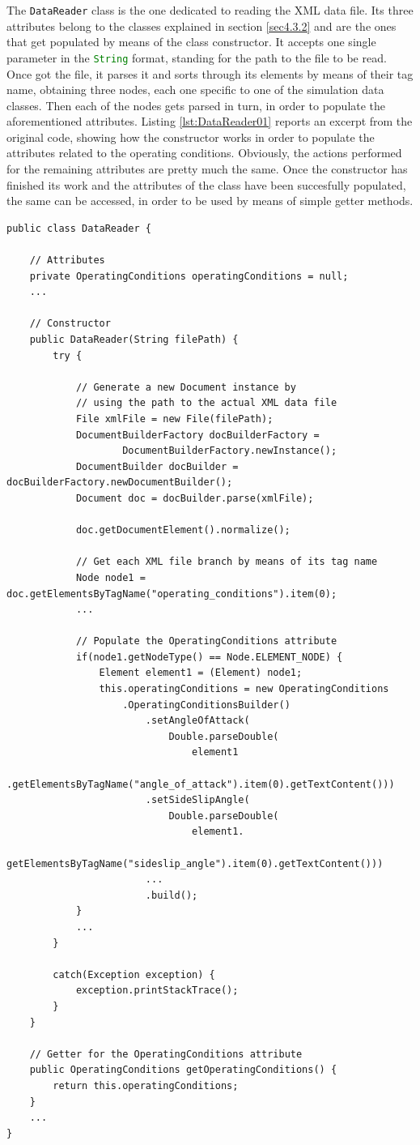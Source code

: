 The \lstinline[language=Java]!DataReader! class is the one dedicated to reading the XML data file. Its three attributes belong to the classes explained in section \ref{sec4.3.2} and are the ones that get populated by means of the class constructor. It accepts one single parameter in the \lstinline[language=Java]!String! format, standing for the path to the file to be read. Once got the file, it parses it and sorts through its elements by means of their tag name, obtaining three nodes, each one specific to one of the simulation data classes. Then each of the nodes gets parsed in turn, in order to populate the aforementioned attributes. Listing \ref{lst:DataReader01} reports an excerpt from the original code, showing how the constructor works in order to populate the attributes related to the operating conditions. Obviously, the actions performed for the remaining attributes are pretty much the same. Once the constructor has finished its work and the attributes of the class have been succesfully populated, the same can be accessed, in order to be used by means of simple getter methods. 
\bigskip
\begin{lstlisting}[caption={\lstinline!DataReader! class overview}, captionpos=b, tabsize=2, label={lst:DataReader01}]
public class DataReader {
	
	// Attributes
	private OperatingConditions operatingConditions = null;
	...
	
	// Constructor
	public DataReader(String filePath) {
		try {
			
			// Generate a new Document instance by  
			// using the path to the actual XML data file
			File xmlFile = new File(filePath);
			DocumentBuilderFactory docBuilderFactory = 
					DocumentBuilderFactory.newInstance();
			DocumentBuilder docBuilder = docBuilderFactory.newDocumentBuilder();
			Document doc = docBuilder.parse(xmlFile);
			
			doc.getDocumentElement().normalize();
			
			// Get each XML file branch by means of its tag name
			Node node1 = doc.getElementsByTagName("operating_conditions").item(0);
			...
			
			// Populate the OperatingConditions attribute
			if(node1.getNodeType() == Node.ELEMENT_NODE) {
				Element element1 = (Element) node1;
				this.operatingConditions = new OperatingConditions
					.OperatingConditionsBuilder()
						.setAngleOfAttack(
							Double.parseDouble(
								element1
								.getElementsByTagName("angle_of_attack").item(0).getTextContent()))
						.setSideSlipAngle(
							Double.parseDouble(
								element1.
								getElementsByTagName("sideslip_angle").item(0).getTextContent()))
						...
						.build();
			}		
			...
		}
		
		catch(Exception exception) {
			exception.printStackTrace();
		}
	}
	
	// Getter for the OperatingConditions attribute
	public OperatingConditions getOperatingConditions() {
		return this.operatingConditions;
	}
	...
}
\end{lstlisting}

